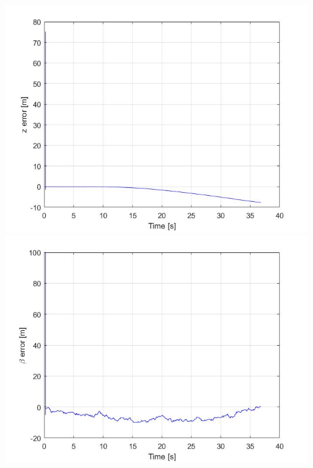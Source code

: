 \documentclass{beamer}
\begin{document}
\begin{frame}
\begin{columns}[t]
			\includegraphics[scale=0.18]{nlo_z_2}\\
			\includegraphics[scale=0.18]{nlo_beta_2}
		\end{columns}
	\end{frame}
\end{document}
